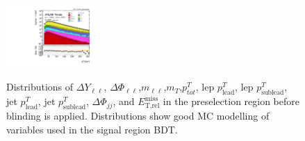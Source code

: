 \begin{figure}[!h]
{      \includegraphics[width=0.3\textwidth]{Pictures/run2-emme-CutVBF_2jet-leadLepPt-log.pdf}
  }\hfill
  \hfill
{\caption{Distributions of $\Delta Y_{\ell\ell}$, $\Delta \Phi_{\ell\ell}$,$m_{\ell\ell}$,$m_T$,$p^T_{tot}$, lep $p^T_{\text{lead}}$, lep $p^T_{\text{sublead}}$, jet $p^T_{\text{lead}}$, jet $p^T_{\text{sublead}}$, $\Delta \Phi_{jj}$, and $\ensuremath{E_{\text{T,rel}}^{\text{miss}}}$ in the preselection region before blinding is applied. Distributions show good MC modelling of variables used in the signal region BDT.
\label{fig:preselection}}}
\end{figure} 

